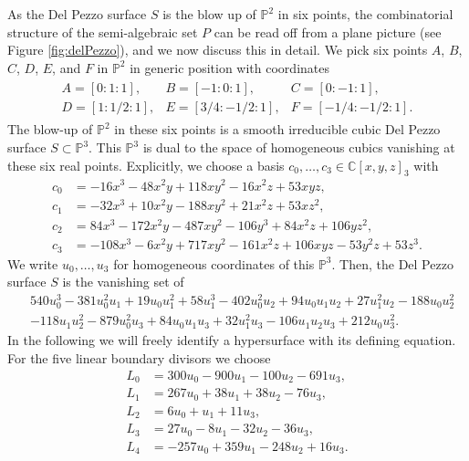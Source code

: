\documentclass[12pt]{extarticle}
\theoremstyle{definition}
\theoremstyle{theorem}
\theoremstyle{remark}
\numberwithin{equation}{section}
\newcommand{\C}{\mathbb{C}}
\newcommand{\PP}{\mathbb{P}}
\begin{document}
As the Del Pezzo surface $S$ is the blow up of $\mathbb{P}^2$ in six points, the combinatorial structure of the semi-algebraic set $P$ can be read off from a plane picture (see Figure \ref{fig:delPezzo}), and we now discuss this in detail.
We pick six points $A$, $B$, $C$, $D$, $E$, and $F$ in $\PP^2$ in generic position with coordinates
\begin{align}
    \begin{array}{lll}
        A = [0:1:1],& B= [-1:0:1], & C=[0:-1:1],\\
        D = [1: 1/2:1],& E = [3/4:-1/2:1],&  F = [-1/4: -1/2:1].
    \end{array}
\end{align}
The blow-up of $\PP^2$ in these six points is a smooth irreducible cubic Del Pezzo surface $S\subset \PP^3$.
This $\PP^3$ is dual to the space of homogeneous cubics vanishing at these six real points. Explicitly, we choose a basis  $c_0,\ldots,c_3\in \C[x,y,z]_3$ with
\begin{align*}
    c_0&=-16 x^{3} - 48 x^{2}y + 118 x y^{2} - 16 x^{2}z + 53 x y z, \\
    c_1&=-32 x^{3} + 10 x^{2}y - 188 x y^{2} + 21 x^{2}z + 53 x z^{2}, \\
    c_2&=84 x^{3} - 172 x^{2}y - 487 x y^{2} - 106 y^{3} + 84 x^{2}z + 106 y z^{2}, \\
    c_3&=-108 x^{3} - 6 x^{2}y + 717 x y^{2} - 161 x^{2}z + 106 x y z - 53 y^{2}z + 53 z^{3}.
\end{align*}
We write $u_0,\ldots,u_3$ for homogeneous coordinates of this $\PP^3$.
Then, the Del Pezzo surface $S$ is the vanishing set of
\begin{align}
    &540u_0^3-381u_0^2u_1+19u_0u_1^2+58u_1^3-402u_0^2u_2+94u_0u_1u_2+27u_1^2u_2-188u_0u_2^2\\
    &-118u_1u_2^2-879u_0^2u_3+84u_0u_1u_3+32u_1^2u_
       3-106u_1u_2u_3+212u_0u_3^2.
\end{align}
In the following we will freely identify a hypersurface with its defining equation.
For the five linear boundary divisors we choose
\begin{align}
    L_0 &= 300u_0 - 900u_1 - 100u_2 - 691u_3,\\
    L_1 &= 267u_0 + 38u_1 + 38u_2 - 76u_3,\\
    L_2 &= 6u_0 + u_1 + 11u_3,\\
    L_3 &= 27u_0 - 8u_1 - 32u_2 - 36u_3,\\
    L_4 &= -257u_0 + 359u_1 - 248u_2 + 16u_3.
\end{align}
\end{document}
